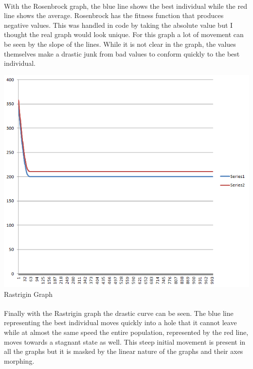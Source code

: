 \documentclass[paper=a4, fontsize=11pt]{scrartcl} %
\numberwithin{equation}{section} %
\numberwithin{figure}{section} %
\numberwithin{table}{section} %
\begin{document}
\paragraph{} With the Rosenbrock graph, the blue line shows the best individual while the red line shows the average. Rosenbrock has the fitness function that produces negative values. This was handled in code by taking the absolute value but I thought the real graph would look unique. For this graph a lot of movement can be seen by the slope of the lines. While it is not clear in the graph, the values themselves make a drastic junk from bad values to conform quickly to the best individual.

\includegraphics{Rastrigin}
Rastrigin Graph

\paragraph{} Finally with the Rastrigin graph the drastic curve can be seen. The blue line representing the best individual moves quickly into a hole that it cannot leave while at almost the same speed the entire population, represented by the red line, moves towards a stagnant state as well. This steep initial movement is present in all the graphs but it is masked by the linear nature of the graphs and their axes morphing.
\end{document}
